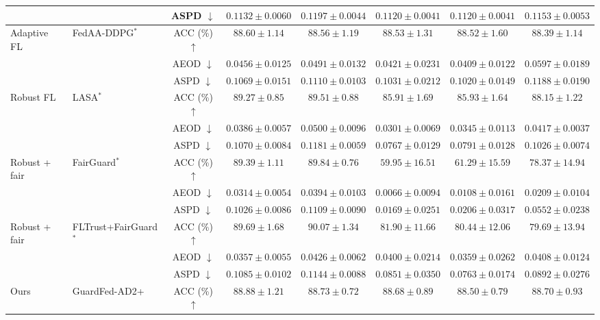 \begin{table}[t]
{\begin{tabular}{l|l|c|ccccc}
 &  & ASPD $\downarrow$ & $0.1132 \pm 0.0060$ & $0.1197 \pm 0.0044$ & $0.1120 \pm 0.0041$ & $0.1120 \pm 0.0041$ & $0.1153 \pm 0.0053$ \\
\hline
\multirow{3}{*}{Adaptive FL} & \multirow{3}{*}{FedAA-DDPG$^{*}$} & ACC (\%) $\uparrow$ & $88.60 \pm 1.14$ & $88.56 \pm 1.19$ & $88.53 \pm 1.31$ & $88.52 \pm 1.60$ & $88.39 \pm 1.14$ \\
 &  & AEOD $\downarrow$ & $0.0456 \pm 0.0125$ & $0.0491 \pm 0.0132$ & $0.0421 \pm 0.0231$ & $0.0409 \pm 0.0122$ & $0.0597 \pm 0.0189$ \\
 &  & ASPD $\downarrow$ & $0.1069 \pm 0.0151$ & $0.1110 \pm 0.0103$ & $0.1031 \pm 0.0212$ & $0.1020 \pm 0.0149$ & $0.1188 \pm 0.0190$ \\
\hline
\multirow{3}{*}{Robust FL} & \multirow{3}{*}{LASA$^{*}$} & ACC (\%) $\uparrow$ & $89.27 \pm 0.85$ & $89.51 \pm 0.88$ & $85.91 \pm 1.69$ & $85.93 \pm 1.64$ & $88.15 \pm 1.22$ \\
 &  & AEOD $\downarrow$ & $0.0386 \pm 0.0057$ & $0.0500 \pm 0.0096$ & $0.0301 \pm 0.0069$ & $0.0345 \pm 0.0113$ & $0.0417 \pm 0.0037$ \\
 &  & ASPD $\downarrow$ & $0.1070 \pm 0.0084$ & $0.1181 \pm 0.0059$ & $0.0767 \pm 0.0129$ & $0.0791 \pm 0.0128$ & $0.1026 \pm 0.0074$ \\
\hline
\multirow{3}{*}{Robust + fair} & \multirow{3}{*}{FairGuard$^{*}$} & ACC (\%) $\uparrow$ & $89.39 \pm 1.11$ & $89.84 \pm 0.76$ & $59.95 \pm 16.51$ & $61.29 \pm 15.59$ & $78.37 \pm 14.94$ \\
 &  & AEOD $\downarrow$ & $0.0314 \pm 0.0054$ & $0.0394 \pm 0.0103$ & $0.0066 \pm 0.0094$ & $0.0108 \pm 0.0161$ & $0.0209 \pm 0.0104$ \\
 &  & ASPD $\downarrow$ & $0.1026 \pm 0.0086$ & $0.1109 \pm 0.0090$ & $0.0169 \pm 0.0251$ & $0.0206 \pm 0.0317$ & $0.0552 \pm 0.0238$ \\
\hline
\multirow{3}{*}{Robust + fair} & \multirow{3}{*}{FLTrust+FairGuard$^{*}$} & ACC (\%) $\uparrow$ & $89.69 \pm 1.68$ & $90.07 \pm 1.34$ & $81.90 \pm 11.66$ & $80.44 \pm 12.06$ & $79.69 \pm 13.94$ \\
 &  & AEOD $\downarrow$ & $0.0357 \pm 0.0055$ & $0.0426 \pm 0.0062$ & $0.0400 \pm 0.0214$ & $0.0359 \pm 0.0262$ & $0.0408 \pm 0.0124$ \\
 &  & ASPD $\downarrow$ & $0.1085 \pm 0.0102$ & $0.1144 \pm 0.0088$ & $0.0851 \pm 0.0350$ & $0.0763 \pm 0.0174$ & $0.0892 \pm 0.0276$ \\
\hline
\multirow{3}{*}{Ours} & \multirow{3}{*}{GuardFed-AD2+} & ACC (\%) $\uparrow$ & $88.88 \pm 1.21$ & $88.73 \pm 0.72$ & $88.68 \pm 0.89$ & $88.50 \pm 0.79$ & $88.70 \pm 0.93$ \\

\end{tabular}}
\end{table}
